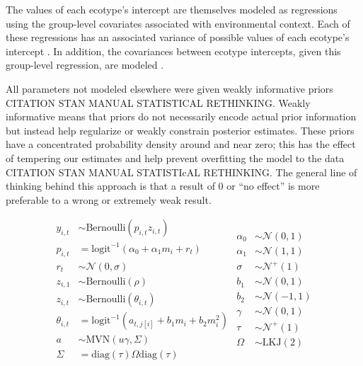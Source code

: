 \documentclass[12pt,letterpaper]{article}
\begin{document}
The values of each ecotype's intercept are themselves modeled as regressions using the group-level covariates associated with environmental context. Each of these regressions has an associated variance of possible values of each ecotype's intercept \citep{Gelman2007}. In addition, the covariances between ecotype intercepts, given this group-level regression, are modeled \citep{Gelman2007}.

All parameters not modeled elsewhere were given weakly informative priors \citep{Gelman2013d} CITATION STAN MANUAL STATISTICAL RETHINKING. Weakly informative means that priors do not necessarily encode actual prior information but instead help regularize or weakly constrain posterior estimates. These priors have a concentrated probability density around and near zero; this has the effect of tempering our estimates and help prevent overfitting the model to the data \citep{Gelman2013d} CITATION STAN MANUAL STATISTIcAL RETHINKING. The general line of thinking behind this approach is that a result of 0 or ``no effect'' is more preferable to a wrong or extremely weak result.

\begin{equation}
  \begin{split}
    y_{i, t} &\sim \text{Bernoulli}(p_{i, t} z_{i, t}) \\
    p_{i, t} &= \text{logit}^{-1}(\alpha_{0} + \alpha_{1} m_{i} + r_{t}) \\ 
    r_{t} &\sim \mathcal{N}(0, \sigma) \\
    z_{i, 1} &\sim \text{Bernoulli}(\rho) \\
    z_{i, t} &\sim \text{Bernoulli}(\theta_{i, t}) \\
    \theta_{i, t} &= \text{logit}^{-1}(a_{t, j[i]} + b_{1} m_{i} + b_{2} m_{i}^{2}) \\
    a &\sim \text{MVN}(u \gamma, \Sigma) \\
    \Sigma &= \text{diag}(\tau) \Omega \text{diag}(\tau) \\
  \end{split}
  \begin{split}
    \alpha_{0} &\sim \mathcal{N}(0, 1) \\
    \alpha_{1} &\sim \mathcal{N}(1, 1) \\
    \sigma &\sim \mathcal{N}^{+}(1) \\
    b_{1} &\sim \mathcal{N}(0, 1) \\
    b_{2} &\sim \mathcal{N}(-1, 1) \\
    \gamma &\sim \mathcal{N}(0, 1) \\
    \tau &\sim \mathcal{N}^{+}(1) \\
    \Omega &\sim \text{LKJ}(2) \\
  \end{split}
  \label{eq:pure_presence}
\end{equation}
\end{document}
